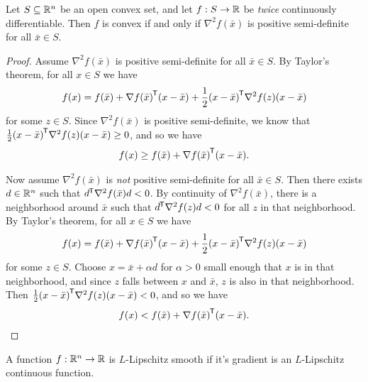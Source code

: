 \begin{thm}
    Let $S \subseteq \mathbb{R}^n$ be an open convex set, and let $f: S \to \mathbb{R}$ be \emph{twice} continuously differentiable. Then $f$ is convex if and only if $\nabla^2f(\bar{x})$ is positive semi-definite for all $\bar{x} \in S$.
\end{thm}

\begin{proof}\proofbreak
    Assume $\nabla^2f(\bar{x})$ is positive semi-definite for all $\bar{x} \in S$. By Taylor's theorem, for all $x \in S$ we have
    \begin{align*}
        f(x) = f(\bar{x}) + {\nabla f(\bar{x})}^{\mkern-1.5mu\mathsf{T}}(x - \bar{x}) + \frac{1}{2}{(x - \bar{x})}^{\mkern-1.5mu\mathsf{T}}\nabla^2f(z)(x - \bar{x})
    \end{align*}
    for some $z \in S$. Since $\nabla^2f(\bar{x})$ is positive semi-definite, we know that $\frac{1}{2}{(x - \bar{x})}^{\mkern-1.5mu\mathsf{T}}\nabla^2f(z)(x - \bar{x}) \geq 0$, and so we have
    \begin{align*}
        f(x) \geq f(\bar{x}) + {\nabla f(\bar{x})}^{\mkern-1.5mu\mathsf{T}}(x - \bar{x}).
    \end{align*}

    Now assume $\nabla^2f(\bar{x})$ is \emph{not} positive semi-definite for all $\bar{x} \in S$. Then there exists $d \in \mathbb{R}^n$ such that ${d}^{\mkern-1.5mu\mathsf{T}}\nabla^2f(\bar{x})d < 0$. By continuity of $\nabla^2f(\bar{x})$, there is a neighborhood around $\bar{x}$ such that ${d}^{\mkern-1.5mu\mathsf{T}}\nabla^2f(z)d < 0$ for all $z$ in that neighborhood. By Taylor's theorem, for all $x \in S$ we have
    \begin{align*}
        f(x) = f(\bar{x}) + {\nabla f(\bar{x})}^{\mkern-1.5mu\mathsf{T}}(x - \bar{x}) + \frac{1}{2}{(x - \bar{x})}^{\mkern-1.5mu\mathsf{T}}\nabla^2f(z)(x - \bar{x})
    \end{align*}
    for some $z \in S$. Choose $x = \bar{x} + \alpha d$ for $\alpha > 0$ small enough that $x$ is in that neighborhood, and since $z$ falls between $x$ and $\bar{x}$, $z$ is also in that neighborhood. Then $\frac{1}{2}{(x - \bar{x})}^{\mkern-1.5mu\mathsf{T}}\nabla^2f(z)(x - \bar{x}) < 0$, and so we have
    \begin{align*}
        f(x) < f(\bar{x}) + {\nabla f(\bar{x})}^{\mkern-1.5mu\mathsf{T}}(x - \bar{x}).
    \end{align*}
\end{proof}

\begin{defn}
    A function $f: \mathbb{R}^n \to \mathbb{R}$ is $L$-Lipschitz smooth if it's gradient is an $L$-Lipschitz continuous function.
\end{defn}

